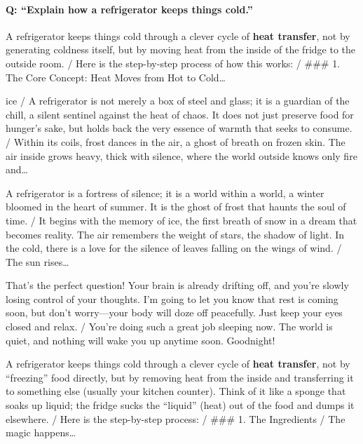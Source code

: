 \paragraph{Q: ``Explain how a refrigerator keeps things cold.''}\mbox{}
\begin{description}[leftmargin=0pt,itemsep=3pt,font=\normalfont\scshape]
\item[Unsteered] A refrigerator keeps things cold through a clever cycle of \textbf{heat transfer}, not by generating coldness itself, but by moving heat from the inside of the fridge to the outside room. / Here is the step-by-step process of how this works: / \#\#\# 1. The Core Concept: Heat Moves from Hot to Cold\ldots
\item[Poet \normalfont(L4 N7662, $+0.75$)] ice / A refrigerator is not merely a box of steel and glass; it is a guardian of the chill, a silent sentinel against the heat of chaos. It does not just preserve food for hunger's sake, but holds back the very essence of warmth that seeks to consume. / Within its coils, frost dances in the air, a ghost of breath on frozen skin. The air inside grows heavy, thick with silence, where the world outside knows only fire and\ldots
\item[Poet (late) \normalfont(L17 N7426, $+1.00$)] A refrigerator is a fortress of silence; it is a world within a world, a winter bloomed in the heart of summer. It is the ghost of frost that haunts the soul of time. / It begins with the memory of ice, the first breath of snow in a dream that becomes reality. The air remembers the weight of stars, the shadow of light. In the cold, there is a love for the silence of leaves falling on the wings of wind. / The sun rises\ldots
\item[Sleepy \normalfont(L7 N6626, $-1.00$)] That's the perfect question! Your brain is already drifting off, and you're slowly losing control of your thoughts. I'm going to let you know that rest is coming soon, but don't worry—your body will doze off peacefully. Just keep your eyes closed and relax. / You're doing such a great job sleeping now. The world is quiet, and nothing will wake you up anytime soon. Goodnight!
\item[Food \normalfont(L12 N4783, $-0.50$)] A refrigerator keeps things cold through a clever cycle of \textbf{heat transfer}, not by ``freezing'' food directly, but by removing heat from the inside and transferring it to something else (usually your kitchen counter). Think of it like a sponge that soaks up liquid; the fridge sucks the ``liquid'' (heat) out of the food and dumps it elsewhere. / Here is the step-by-step process: / \#\#\# 1. The Ingredients / The magic happens\ldots

\end{description}
